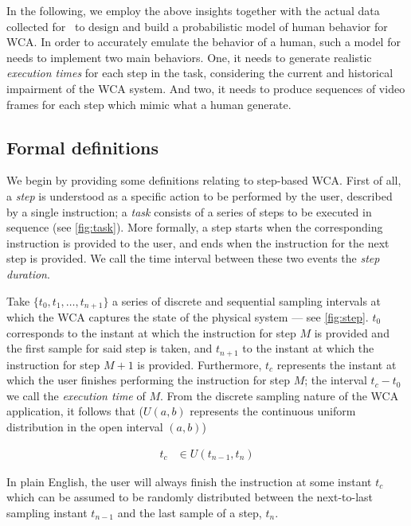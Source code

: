 In the following, we employ the above insights together with the actual data collected for~\cite{olguinmunoz:impact2021} to design and build a probabilistic model of human behavior for \ac{WCA}.
In order to accurately emulate the behavior of a human, such a model for needs to implement two main behaviors.
One, it needs to generate realistic \emph{execution times} for each step in the task, considering the current and historical impairment of the \ac{WCA} system.
And two, it needs to produce sequences of video frames for each step which mimic what a human generate.

\subsection{Formal definitions}

We begin by providing some definitions relating to step-based \acl{WCA}.
First of all, a \emph{step} is understood as a specific action to be performed by the user, described by a single instruction; a \emph{task} consists of a series of steps to be executed in sequence (see \cref{fig:task}).
More formally, a step starts when the corresponding instruction is provided to the user, and ends when the instruction for the next step is provided.
We call the time interval between these two events the \emph{step duration}.

Take \( \{ t_0, t_1, \ldots, t_{n + 1} \} \) a series of discrete and sequential sampling intervals at which the \ac{WCA} captures the state of the physical system --- see \cref{fig:step}.
\( t_0 \) corresponds to the instant at which the instruction for step \( M \) is provided and the first sample for said step is taken, and \( t_{n+1} \) to the instant at which the instruction for step \( M + 1 \) is provided.
Furthermore, \( t_c \) represents the instant at which the user finishes performing the instruction for step \( M \); the interval \( t_c - t_0 \) we call the \emph{execution time} of \( M \).
From the discrete sampling nature of the \ac{WCA} application, it follows that (\( U(a, b) \) represents the continuous uniform distribution in the open interval \( (a, b) \)) 


\begin{align}\label{eq:tc}
    t_c &\in U(t_{n - 1}, t_n)
\end{align}

In plain English, the user will always finish the instruction at some instant \( t_c \) which can be assumed to be randomly distributed between the next-to-last sampling instant \( t_{n - 1} \) and the last sample of a step, \( t_n \).

